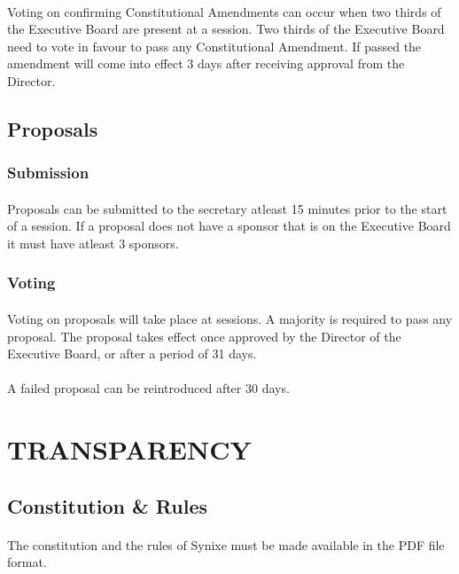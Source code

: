 \documentclass[10pt,a4paper]{article}
\begin{document}
\paragraph{}
Voting on confirming Constitutional Amendments can occur when two thirds of the Executive Board are present at a session. Two thirds of the Executive Board need to vote in favour to pass any Constitutional Amendment. If passed the amendment will come into effect 3 days after receiving approval from the Director.
\subsection{Proposals}
\subsubsection{Submission}
\paragraph{}
Proposals can be submitted to the secretary atleast 15 minutes prior to the start of a session. If a proposal does not have a sponsor that is on the Executive Board it must have atleast 3 sponsors.
\subsubsection{Voting}
\paragraph{}
Voting on proposals will take place at sessions. A majority is required to pass any proposal. The proposal takes effect once approved by the Director of the Executive Board, or after a period of 31 days.
\paragraph{}
A failed proposal can be reintroduced after 30 days.
\section{TRANSPARENCY}
\subsection{Constitution \& Rules}
\paragraph{}
The constitution and the rules of Synixe must be made available in the PDF file format.
\end{document}
